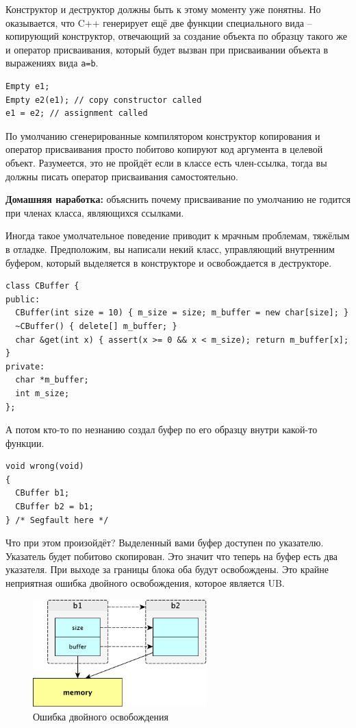 \documentclass[a4paper,12pt,oneside]{article}
\begin{document}
Конструктор и деструктор должны быть к этому моменту уже понятны. Но оказывается, что C++ генерирует ещё две функции специального вида – копирующий конструктор, отвечающий за создание объекта по образцу такого же и оператор присваивания, который будет вызван при присваивании объекта в выражениях вида \lstinline!a=b!.

\begin{lstlisting}
Empty e1;
Empty e2(e1); // copy constructor called
e1 = e2; // assignment called 
\end{lstlisting}

По умолчанию сгенерированные компилятором конструктор копирования и оператор присваивания просто побитово копируют код аргумента в целевой объект. Разумеется, это не пройдёт если в классе есть член-ссылка, тогда вы должны писать оператор присваивания самостоятельно.

\textbf{Домашняя наработка:} объяснить почему присваивание по умолчанию не годится при членах класса, являющихся ссылками.

Иногда такое умолчательное поведение приводит к мрачным проблемам, тяжёлым в отладке. Предположим, вы написали некий класс, управляющий внутренним буфером, который выделяется в конструкторе и освобождается в деструкторе.

\begin{lstlisting}
class CBuffer {
public:
  CBuffer(int size = 10) { m_size = size; m_buffer = new char[size]; }
  ~CBuffer() { delete[] m_buffer; }
  char &get(int x) { assert(x >= 0 && x < m_size); return m_buffer[x]; } 
private:
  char *m_buffer;
  int m_size;
};
\end{lstlisting}

А потом кто-то по незнанию создал буфер по его образцу внутри какой-то функции.

\begin{lstlisting}
void wrong(void)
{
  CBuffer b1;
  CBuffer b2 = b1;
} /* Segfault here */
\end{lstlisting}

Что при этом произойдёт? Выделенный вами буфер доступен по указателю. Указатель будет побитово скопирован. Это значит что теперь на буфер есть два указателя. При выходе за границы блока оба будут освобождены. Это крайне неприятная ошибка двойного освобождения, которое является UB.

\begin{figure}[h!]
\centering
\includegraphics[width=0.6\textwidth]{illustrations/copying-crop.pdf}
\caption{Ошибка двойного освобождения}
\label{fig:copying-crop}
\end{figure}
\end{document}
